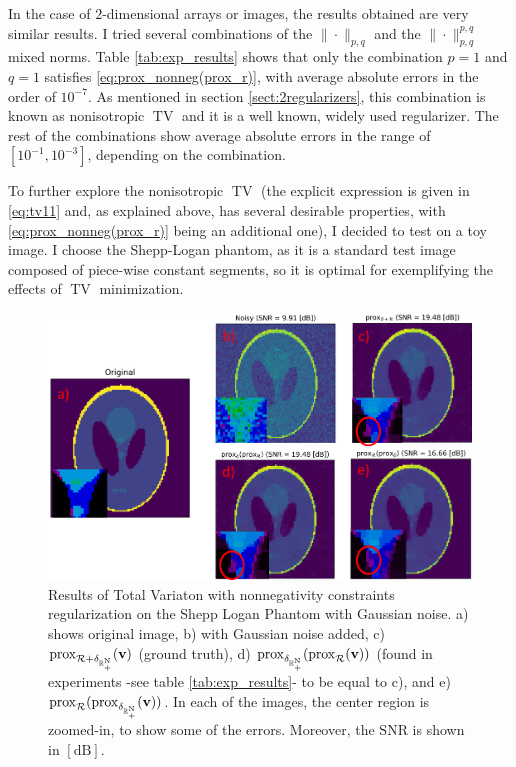 In the case of $2$-dimensional arrays or images, the results obtained are very similar results. I tried several combinations of the $\|\cdot\|_{p, q}$ and the $\|\cdot\|_{p, q}^{p, q}$ mixed norms. Table \ref{tab:exp_results} shows that only the combination $p = 1$ and $q = 1$ satisfies  \eqref{eq:prox_nonneg(prox_r)}, with average absolute errors in the order of $10^{-7}$. As mentioned in section \ref{sect:2regularizers}, this combination is known as nonisotropic $\operatorname{TV}$ and it is a well known, widely used regularizer. The rest of the combinations show average absolute errors in the range of $[10^{-1}, 10^{-3}]$, depending on the combination. 

To further explore the nonisotropic $\operatorname{TV}$ (the explicit expression is given in \eqref{eq:tv11} and, as explained above, has several desirable properties, with  \eqref{eq:prox_nonneg(prox_r)} being an additional one), I decided to test on a toy image. I choose the Shepp-Logan phantom, as it is a standard test image composed of piece-wise constant segments, so it is optimal for exemplifying the effects of $\operatorname{TV}$ minimization. 

\begin{figure}[H]
  \begin{center}
  \includegraphics[scale = 0.6]{images/TV_experiments.png}
  \caption{Results of Total Variaton with nonnegativity constraints regularization on the Shepp Logan Phantom with Gaussian noise. a) shows original image, b) with Gaussian noise added, c) $\mathrm{prox}_{\mathcal{R} + \delta_{\rm \mathbb{R}_+^N}}(\mathbf{v})$ (ground truth), d) $\mathrm{prox}_{\delta_{\rm \mathbb{R}_+^N}}(\mathrm{prox}_{\mathcal{R}}(\mathbf{v}))$ (found in experiments -see table \ref{tab:exp_results}- to be equal to c), and e) $\mathrm{prox}_{\mathcal{R}}(\mathrm{prox}_{\delta_{\rm \mathbb{R}_+^N}}(\mathbf{v}))$. In each of the images, the center region is zoomed-in, to show some of the errors. Moreover, the $\mathrm{SNR}$ is shown in $\operatorname{[dB]}$.}
  \label{fig:tv_experiment}
  \end{center}
\end{figure}

